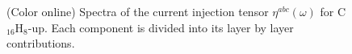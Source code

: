 \documentclass[pss]{wiley2sp} %
\begin{document}
\begin{figure}[b]
\centering
{}\\
\\
\caption{(Color online) Spectra of the current injection tensor
{$\eta^{abc}(\omega)$} for C$_{16}$H$_{8}$-up. Each component is divided into
its layer by layer contributions.\label{fig:up-eta}}
\end{figure}
\end{document}
